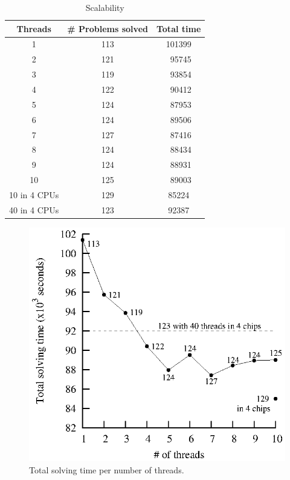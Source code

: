 \begin{table}[hhh]
  \centering
  \begin{tabular}[h]{ccc}
    \hline
    {\bf Threads} & {\bf \# Problems solved} & {\bf Total time}\\
    \hline
    1&113&101399\\
    2&121&~95745\\
    3&119&~93854\\
    4&122&~90412\\
    5&124&~87953\\
    6&124&~89506\\
    7&127&~87416\\
    8&124&~88434\\
    9&124&~88931\\
    10&125&~89003\\
    10 in 4 CPUs & 129 & 85224\\
    40 in 4 CPUs & 123 & 92387\\
    \hline
    \hline
  \end{tabular}    
  \caption{Scalability}
  \label{tab:scal}
\end{table}


\begin{figure}[htp]
  \centering
  \includegraphics[scale=1]{plingeling_207_files}
  \caption{Total solving time per number of threads.}
  \label{fig:pperfpthread}
\end{figure}

